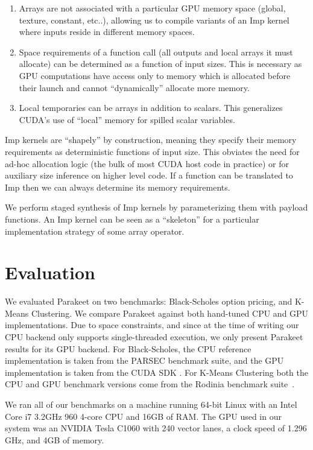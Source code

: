 \documentclass[10pt,twocolumn]{article}
\begin{document}
\begin{enumerate}
\item  Arrays are not associated with a particular GPU memory space (global, texture, constant, etc..), allowing us to compile variants of an Imp kernel where inputs reside in different memory spaces.

\item Space requirements of a function call (all outputs and local arrays it must allocate) can be determined as a function of input sizes. This is necessary as GPU computations have access only to memory which is allocated before their launch and cannot ``dynamically'' allocate more memory.

\item Local temporaries can be arrays in addition to scalars. This generalizes CUDA's use of ``local'' memory for spilled scalar variables.
\end{enumerate}
Imp kernels are ``shapely'' by construction, meaning they specify their memory requirements as deterministic functions of input size. This obviates the need for ad-hoc allocation logic (the bulk of most CUDA host code in practice) or for auxiliary size inference on higher level code. If a function can be translated to Imp then we can always determine its memory requirements.

We perform staged synthesis of Imp kernels by parameterizing them with payload functions. An Imp kernel can be seen as a ``skeleton'' \cite{Cole04} for a particular implementation strategy of some array operator.  

\section{Evaluation}
\label{Evaluation}

We evaluated Parakeet on two benchmarks: Black-Scholes option pricing, and K-Means Clustering.  We compare Parakeet against both hand-tuned CPU and GPU implementations.  Due to space constraints, and since at the time of writing our CPU backend only supports single-threaded execution, we only present Parakeet results for its GPU backend.  For Black-Scholes, the CPU reference implementation is taken from the PARSEC \cite{Bien08} benchmark suite, and the GPU implementation is taken from the CUDA SDK \cite{NvidSD}.  For K-Means Clustering both the CPU and GPU benchmark versions come from the Rodinia benchmark suite~\cite{Che09}.

We ran all of our benchmarks on a machine running 64-bit Linux with an Intel Core i7 3.2GHz 960 4-core CPU  and 16GB of RAM.  The GPU used in our system was an NVIDIA Tesla C1060 with 240 vector lanes, a clock speed of 1.296 GHz, and 4GB of memory.
\end{document}
